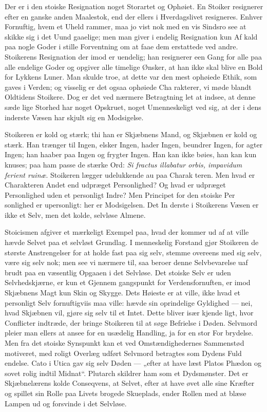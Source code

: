 \documentclass[12pt]{book}
\newcommand{\opage}[1]{\marginnote{\footnotesize\textit{[#1]}}}
\begin{document}
Der er i den stoiske Resignation noget Storartet og
Ophøiet. En Stoiker resignerer efter en ganske anden
Maalestok, end der ellers i Hverdagslivet resigneres.
Enhver Fornuftig, hvem et Uheld rammer, maa jo vist\-%
nok med en vis Sindsro see at skikke sig i det Uund\-%
gaaelige; men man giver i endelig Resignation kun Af\-%
kald paa nogle Goder i stille Forventning om at faae
dem erstattede ved andre. Stoikerens Resignation der\-%
imod er uendelig; han resignerer een Gang for alle paa
\opage{211}\setcounter{footnote}{0}%
alle endelige Goder og opgiver alle timelige Ønsker, at
han ikke skal blive en Bold for Lykkens Luner. Man
skulde troe, at dette var den mest ophøiede Ethik, som
gaves i Verden; og visselig er det ogsaa ophøiede Cha\-%
rakterer, vi møde blandt Oldtidens Stoikere. Dog er det
ved nærmere Betragtning let at indsee, at denne sæde\-%
lige Storhed har noget Opskruet, noget Umenneskeligt
ved sig, at der i dens inderste Væsen har skjult sig en
Modsigelse.

Stoikeren er kold og stærk; thi han er Skjæbnens
Mand, og Skjæbnen er kold og stærk. Han trænger til
Ingen, elsker Ingen, hader Ingen, beundrer Ingen, for\-%
agter Ingen; han haaber paa Ingen og frygter Ingen. Han
kan ikke bøies, han kan kun knuses; paa ham passe de
stærke Ord: \textit{Si fractus illabatur orbis, impavidum ferient
ruinæ}. Stoikeren lægger udelukkende au paa Charak\-%
teren. Men hvad er Charakteren Andet end udpræget
Personlighed? Og hvad er udpræget Personlighed uden
et personligt Indre? Men Principet for den stoiske Per\-%
sonlighed er upersonligt: her er Modsigelsen. Det In\-%
derste i Stoikerens Væsen er ikke et Selv, men det
kolde, selvløse Almene.

Stoicismen afgiver et mærkeligt Exempel paa, hvad
der kommer ud af at ville hævde Selvet paa et selvløst
Grundlag. I menneskelig Forstand gjør Stoikeren de
største Anstrengelser for at holde fast paa sig selv,
stemme overeens med sig selv, være sig selv nok; men
see vi nærmere til, saa beroer denne Selvbevarelse uaf\-%
brudt paa en væsentlig Opgaaen i det Selvløse. Det
stoiske Selv er uden Selvhedskjærne, er kun et Gjennem\-%
gangspunkt for Verdensfornuften, er imod Skjæbnens
Magt kun Skin og Skygge. Dets Høieste er at ville,
ikke hvad et personligt Selv fornuftigviis maa ville:
hævde sin oprindelige Gyldighed --- nei, hvad Skjæbnen
\opage{212}\setcounter{footnote}{0}%
vil, gjøre sig selv til et Intet. Dette bliver især kjende\-%
ligt, hvor Conflicter indtræde, der bringe Stoikeren til
at søge Befrielse i Døden. Selvmord pleier man ellers
at ansee for en usædelig Handling, ja for en stor For\-%
brydelse. Men fra det stoiske Synspunkt kan et ved
Omstændighedernes Sammenstød motiveret, med roligt
Overlæg udført Selvmord betragtes som Dydens Fuld\-%
endelse. Cato i Utica gav sig selv Døden --- „efter at
have læst Platos Phædon og sovet rolig indtil Midnat“.
Plutarch skildrer ham som et Dydsmønster. Det er
Skjæbnelærens kolde Conseqvens, at Selvet, efter at have
øvet alle sine Kræfter og spillet sin Rolle paa Livets
brogede Skueplads, ender Rollen med at blæse Lampen
ud og forsvinde i det Selvløse.
\end{document}
